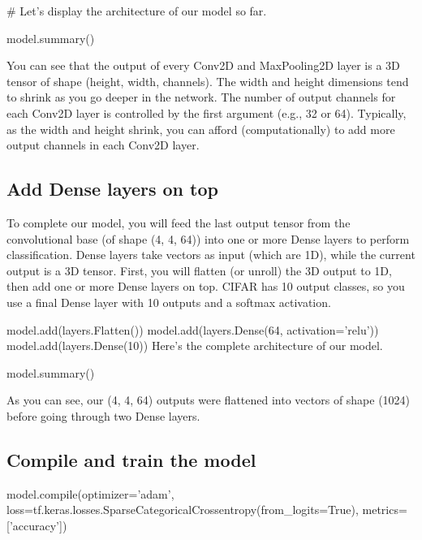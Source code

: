 \documentclass[%
oneside,                 %
final,                   %
10pt]{article}
\begin{document}
# Let's display the architecture of our model so far.

model.summary()

\epycod


You can see that the output of every Conv2D and MaxPooling2D layer is a 3D tensor of shape (height, width, channels). The width and height dimensions tend to shrink as you go deeper in the network. The number of output channels for each Conv2D layer is controlled by the first argument (e.g., 32 or 64). Typically, as the width and height shrink, you can afford (computationally) to add more output channels in each Conv2D layer.

\subsection{Add Dense layers on top}

To complete our model, you will feed the last output tensor from the
convolutional base (of shape (4, 4, 64)) into one or more Dense layers
to perform classification. Dense layers take vectors as input (which
are 1D), while the current output is a 3D tensor. First, you will
flatten (or unroll) the 3D output to 1D, then add one or more Dense
layers on top. CIFAR has 10 output classes, so you use a final Dense
layer with 10 outputs and a softmax activation.








\bpycod
model.add(layers.Flatten())
model.add(layers.Dense(64, activation='relu'))
model.add(layers.Dense(10))
Here's the complete architecture of our model.

model.summary()

\epycod

As you can see, our (4, 4, 64) outputs were flattened into vectors of shape (1024) before going through two Dense layers.

\subsection{Compile and train the model}









\bpycod
model.compile(optimizer='adam',
              loss=tf.keras.losses.SparseCategoricalCrossentropy(from_logits=True),
              metrics=['accuracy'])
\end{document}
